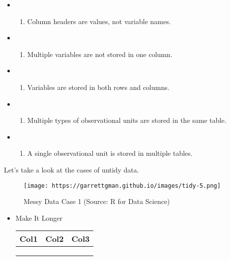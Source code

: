 \documentclass[
]{book}
\providecommand{\tightlist}{%
  \setlength{\itemsep}{0pt}\setlength{\parskip}{0pt}}
\begin{document}
\begin{itemize}
\item
  \begin{enumerate}
  \def\labelenumi{\arabic{enumi}.}
  \tightlist
  \item
    Column headers are values, not variable names.
  \end{enumerate}
\item
  \begin{enumerate}
  \def\labelenumi{\arabic{enumi}.}
  \setcounter{enumi}{1}
  \tightlist
  \item
    Multiple variables are not stored in one column.
  \end{enumerate}
\item
  \begin{enumerate}
  \def\labelenumi{\arabic{enumi}.}
  \setcounter{enumi}{2}
  \tightlist
  \item
    Variables are stored in both rows and columns.
  \end{enumerate}
\item
  \begin{enumerate}
  \def\labelenumi{\arabic{enumi}.}
  \setcounter{enumi}{3}
  \tightlist
  \item
    Multiple types of observational units are stored in the same table.
  \end{enumerate}
\item
  \begin{enumerate}
  \def\labelenumi{\arabic{enumi}.}
  \setcounter{enumi}{4}
  \tightlist
  \item
    A single observational unit is stored in multiple tables.
  \end{enumerate}
\end{itemize}

Let's take a look at the cases of untidy data.

\begin{figure}
\centering
\texttt{[image: https://garrettgman.github.io/images/tidy-5.png]}
\caption{Messy Data Case 1 (Source: R for Data Science)}
\end{figure}

\begin{itemize}
\item
  Make It Longer

  \begin{longtable}[]{@{}lll@{}}
  \toprule
  Col1 & Col2 & Col3 \\
  \midrule
  \endhead
  & & \\
  & & \\
  & & \\
  \bottomrule
  \end{longtable}
\end{itemize}
\end{document}
